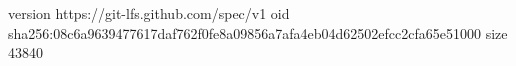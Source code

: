 version https://git-lfs.github.com/spec/v1
oid sha256:08c6a9639477617daf762f0fe8a09856a7afa4eb04d62502efcc2cfa65e51000
size 43840
